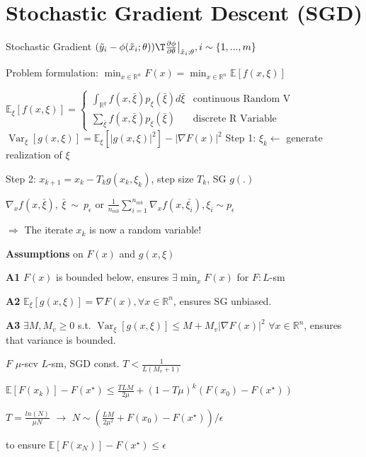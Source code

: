 \section{Stochastic Gradient Descent (SGD)}

Stochastic Gradient
$(\tilde{y}_i - \phi(\tilde{x}_i;\theta))\T
	\frac{\partial\phi}{\partial\theta}\big|_{\tilde{x}_i;\theta}
	,i\sim\{1,...,m\}$

Problem formulation:
$\min _{x \in \mathbb{R}^{n}} F(x)
	= \min _{x \in \mathbb{R}^{n}} \mathbb{E} [f(x,\xi)]$




$\mathbb{E}_\xi[f(x,\xi)]=
	\begin{cases}
		\int_{\mathbb{R}^{q}}f(x,\bar{\xi})p_\xi(\bar\xi)d\bar{\xi}
		 & \text{continuous Random V}
		\\
		\sum_{\bar{\xi}}f(x,\bar{\xi})p_\xi(\bar\xi)
		 & \text{discrete R Variable}
	\end{cases}$
$\operatorname{Var}_{\xi}[g(x,\xi)]=
	\mathbb{E}_\xi[|g(x,\xi)|^2]-|\nabla F(x)|^2$
Step 1: $\xi_k \leftarrow$ generate realization of $\xi$

Step 2: $x_{k+1} = x_k - T_k  g(x_k,\xi_k)$, step size $T_k$, SG $g(.)$

$\nabla_xf(x,\bar{\xi}),\ \bar{\xi}\ \sim \ p_\epsilon$
or
$\frac{1}{n_{mb}}\sum_{i=1}^{n_{mb}}\nabla_xf(x,\bar{\xi_i}), \xi_i \sim p_\epsilon$

$\Rightarrow$ The iterate $x_k$ is now a random variable!

\textbf{Assumptions} on $F(x)$ and $g(x,\xi)$

\textbf{A1} $F(x)$ is bounded below,
ensures $\exists\min_{x}F(x)$ for $F:L$-sm

\textbf{A2} $\mathbb{E}_\xi[g(x,\xi)]=\nabla F(x),
	\forall x \in \mathbb{R}^{n}$,
ensures SG unbiased.

\textbf{A3} $\exists M,M_v\ge0$ s.t.
$\operatorname{Var}_{\xi}[g(x,\xi)]\le
	M+M_v|\nabla F(x)|^2$
$\forall x\in\mathbb{R}^{n}$,
ensures that variance is bounded.




\begin{proposition}
	$F$ $\mu$-scv $L$-sm,
	SGD const.
	$T<\frac{1}{L(M_v + 1)}$

	$\mathbb{E}[F(x_k)]-F(x^\star)\le
		\frac{TLM}{2\mu}+(1-T\mu)^k(F(x_0)-F(x^\star))$

	$T=\frac{ln(N)}{\mu N}$
	$\rightarrow$
	$N\sim\left(\frac{LM}{2\mu^2}+F(x_0)-F(x^\star)\right)/\epsilon$

	to ensure
	$\mathbb{E}[F(x_N)] - F(x^\star)\le\epsilon$
\end{proposition}

